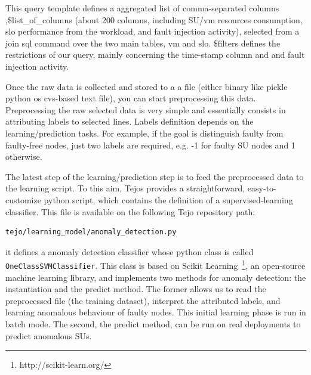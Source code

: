 This query template defines a aggregated list of comma-separated columns ,\$list\_of\_columns (about 200 columns, including SU/vm resources consumption, slo performance from the workload, and fault injection activity), selected from a join sql command over the two main tables, vm and slo. \$filters defines the restrictions of our query, mainly concerning the time-stamp column and and fault injection activity.

Once the raw data is collected and stored to a a file (either binary like pickle python os cvs-based text file), you can start preprocessing this data. Preprocessing the raw selected data is very simple and essentially consists in attributing labels to selected lines. Labels definition depends on the learning/prediction tasks. For example, if the goal is distinguish faulty from faulty-free nodes, just two labels are required, e.g. -1 for faulty SU nodes and 1 otherwise.

The latest step of the learning/prediction step is to feed the preprocessed data to the learning script. To this aim, Tejos provides a straightforward, easy-to-customize python script, which contains the definition of a supervised-learning classifier. This file is available on the following Tejo repository path:

\begin{lstlisting}
tejo/learning_model/anomaly_detection.py
\end{lstlisting}

it defines a anomaly detection classifier whose python class is called \verb|OneClassSVMClassifier|. This class is based on Scikit Learning~\footnote{http://scikit-learn.org/}, an open-source machine learning library, and implements two methods for anomaly detection: the instantiation and the predict method. The former allows us to read the preprocessed file (the training dataset), interpret the attributed labels, and learning anomalous behaviour of faulty nodes. This initial learning phase is run in batch mode. The second, the predict method, can be run on real deployments to predict anomalous SUs. 